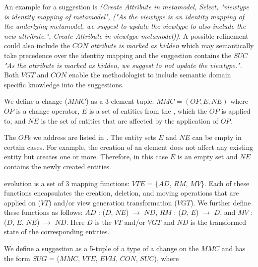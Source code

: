 An example for a suggestion is \textit{(Create Attribute in metamodel, Select,  "viewtype is identity mapping of metamodel", ("As the viewtype is an identity mapping of the underlying metamodel, we suggest to update the viewtype to also include the new attribute.", Create Attribute in viewtype metamodel))}. A possible refinement could also include the $CON$ \textit{attribute is marked as hidden} which may semantically take precedence over the identity mapping and the suggestion contains the $SUC$ \textit{"As the attribute is marked as hidden, we suggest to not update the viewtype."}. Both $VGT$ and $CON$ enable the methodologist to include semantic domain specific knowledge into the suggestions.


\begin{definition} 
    We define a \metamodel change ($MMC$) as a 3-element tuple: $MMC = (OP, E, NE)$ where $OP$ is a \metamodel change operator, $E$ is a set of entities from the \metamodel, which the $OP$ is applied to, and $NE$ is the set of entities that are affected by the application of $OP$.
\end{definition}
The $OP$s we address are listed in . The entity sets $E$ and $NE$ can be empty in certain cases. For example, the creation of an element does not affect any existing entity but creates one or more. Therefore, in this case $E$ is an empty set and $NE$ contains the newly created entities.

\begin{definition} 
    \Viewtype evolution is a set of 3 mapping functions: $VTE$ = \{$AD$, $RM$, $MV$\}. Each of these functions encapsulates the creation, deletion, and moving operations that are applied on \viewtype ($VT$) and/or view generation transformation ($VGT$). We further define these functions as follows: $AD$ : ($D$, $NE$) $\rightarrow$ $ND$, $RM$ : ($D$, $E$) $\rightarrow$ $D$, and $MV$ : ($D$, $E$, $NE$) $\rightarrow$ $ND$. Here $D$ is the $VT$ and/or $VGT$ and $ND$ is the transformed state of the corresponding entities. 
\end{definition}

\begin{definition}[Suggestion (v2)]
    We define a suggestion as a 5-tuple of a type of a change on the $MMC$ and has the form $SUG$ = ($MMC$, $VTE$, $EVM$, $CON$, $SUC$), where 
\end{definition}
